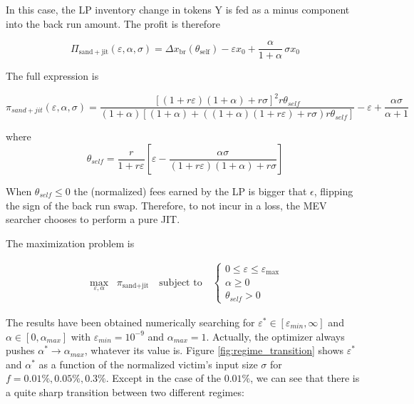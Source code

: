 \documentclass[a4paper,11pt]{article}
\begin{document}
In this case, the LP inventory change in tokens Y is fed as a minus component into the back run amount. The profit is therefore 

\begin{equation}
    \Pi_{\mathrm{sand+jit}}(\varepsilon, \alpha, \sigma)
    = \Delta x_{\mathrm{br}}(\theta_{\mathrm{self}}) - \varepsilon x_0 + \frac{\alpha}{1+\alpha}\,\sigma x_0
\end{equation}

The full expression is

\begin{equation}
\pi_{sand+jit}(\varepsilon, \alpha, \sigma) = \frac{[(1 + r\varepsilon)(1 + \alpha) + r\sigma ]^2r\theta_{self}}{(1 + \alpha)\left[(1 + \alpha) + ((1 + \alpha)(1 + r\varepsilon) + r\sigma) r\theta_{self}\right]} - \varepsilon + \frac{\alpha\sigma}{\alpha + 1}
\end{equation}

where
\begin{equation}
    \theta_{self} = \frac{r}{1+r\varepsilon} \left[\varepsilon - \frac{\alpha \sigma}{(1+r\varepsilon)(1+\alpha)+r\sigma}\right]
\end{equation}

When $\theta_{self}\leq0$ the (normalized) fees earned by the LP is bigger that $\epsilon$, flipping the sign of the back run swap. Therefore, to not incur in a loss, the MEV searcher chooses to perform a pure JIT.

The maximization problem is 

\begin{equation}
\begin{aligned}
\max_{\varepsilon,\alpha} \;\; \pi_{\text{sand+jit}} \quad \text{subject to} \quad
\begin{cases}
0 \leq \varepsilon \leq \varepsilon_{\max} \\
\alpha \geq 0 \\
\theta_{self} >0
\end{cases}
\end{aligned}
\end{equation}

The results have been obtained numerically searching for $\varepsilon^* \in [\varepsilon_{min}, \infty]$ and $\alpha \in [0, \alpha_{max}]$ with $\varepsilon_{min}=10^{-9}$ and $\alpha_{max} = 1$. Actually, the optimizer always pushes $\alpha^* \to \alpha_{max}$, whatever its value is. Figure \ref{fig:regime_transition} shows  $\varepsilon^*$ and $\alpha^*$ as a function of the normalized victim's input size $\sigma$ for $f=0.01\%, 0.05\%, 0.3\%$. Except in the case of the $0.01\%$, we can see that there is a quite sharp transition between two different regimes:
\end{document}

